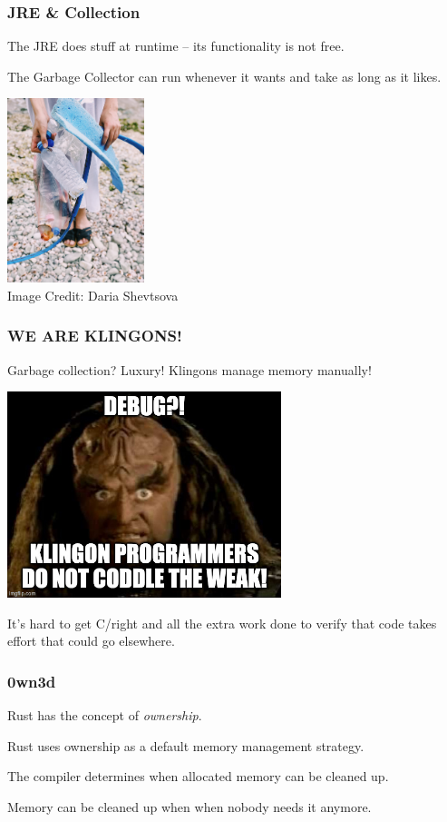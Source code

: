 \begin{frame}
\frametitle{JRE \& Collection}

The JRE does stuff at runtime -- its functionality is not free. 

The Garbage Collector can run whenever it wants and take as long as it likes.

\begin{center}
	\includegraphics[width=0.3\textwidth]{images/garbage.jpg}\\
	Image Credit: Daria Shevtsova
\end{center}

\end{frame}


\begin{frame}
\frametitle{WE ARE KLINGONS!}

Garbage collection? Luxury! Klingons manage memory manually!

\begin{center}
	\includegraphics[width=0.6\textwidth]{images/klingon.jpg}
\end{center}


It's hard to get C/\CPP right and all the extra work done to verify that code takes effort that could go elsewhere.



\end{frame}


\begin{frame}
\frametitle{0wn3d}

Rust has the concept of \textit{ownership}. 

Rust uses ownership as a default memory management strategy.

The compiler determines when allocated memory can be cleaned up.

Memory  can be cleaned up when when nobody needs it anymore.

\end{frame}


